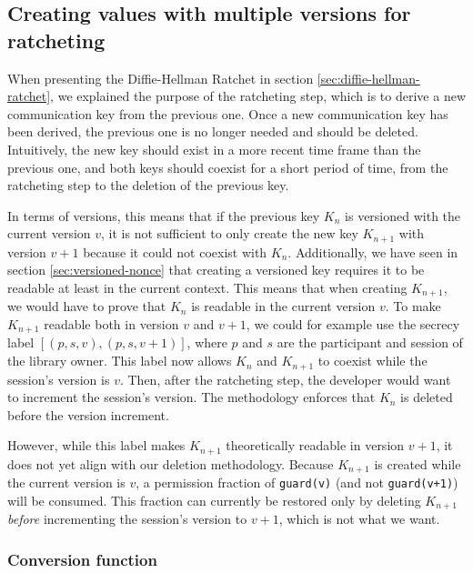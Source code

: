 \subsection{Creating values with multiple versions for ratcheting}

When presenting the Diffie-Hellman Ratchet in section \ref{sec:diffie-hellman-ratchet}, we explained the purpose of the ratcheting step, which is to derive a new communication key from the previous one. Once a new communication key has been derived, the previous one is no longer needed and should be deleted.
Intuitively, the new key should exist in a more recent time frame than the previous one, and both keys should coexist for a short period of time, from the ratcheting step to the deletion of the previous key.

In terms of versions, this means that if the previous key $K_n$ is versioned with the current version $v$, it is not sufficient to only create the new key $K_{n+1}$ with version $v+1$ because it could not coexist with $K_n$.
Additionally, we have seen in section \ref{sec:versioned-nonce} that creating a versioned key requires it to be readable at least in the current context. This means that when creating $K_{n+1}$, we would have to prove that $K_n$ is readable in the current version $v$. To make $K_{n+1}$ readable both in version $v$ and $v+1$, we could for example use the secrecy label $[(p,s,v), (p,s,v+1)]$, where $p$ and $s$ are the participant and session of the library owner.
This label now allows $K_n$ and $K_{n+1}$ to coexist while the session's version is $v$.
Then, after the ratcheting step, the developer would want to increment the session's version. The methodology enforces that $K_n$ is deleted before the version increment.

However, while this label makes $K_{n+1}$ theoretically readable in version $v+1$, it does not yet align with our deletion methodology. Because $K_{n+1}$ is created while the current version is $v$, a permission fraction of \texttt{guard(v)} (and not \texttt{guard(v+1)}) will be consumed. This fraction can currently be restored only by deleting $K_{n+1}$ \emph{before} incrementing the session's version to $v+1$, which is not what we want.

\subsubsection{Conversion function}

